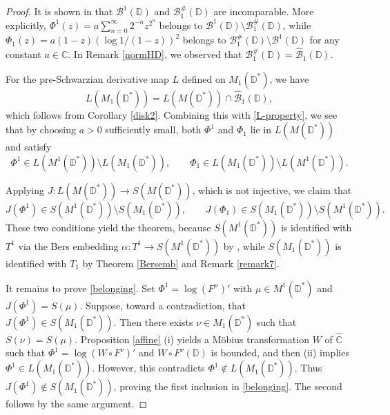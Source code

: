 \documentclass[amstex,12pt,reqno]{amsart}
\theoremstyle{definition}
\begin{document}
\begin{proof}
It is shown in \cite[p.17]{HW} that
$\mathcal B^1(\mathbb D)$ and $\mathcal B_1^\#(\mathbb D)$ are incomparable. 
More explicitly, $\Phi^1(z)=a\sum_{n=0}^\infty 2^{-n}z^{2^n}$ belongs to 
$\mathcal B^1(\mathbb D) \setminus \mathcal B_1^\#(\mathbb D)$, while
$\Phi_1(z)=a(1-z)(\log 1/(1-z))^2$ belongs to $\mathcal B_1^\#(\mathbb D) \setminus \mathcal B^1(\mathbb D)$ for
any constant $a \in \mathbb C$.
In Remark \ref{normHD}, we observed that
$\mathcal B_1^\#(\mathbb D)=\widehat{\mathcal B}_1(\mathbb D)$. 

For the pre-Schwarzian derivative map $L$
defined on $M_1(\mathbb D^*)$, we have
\begin{equation}
L(M_1(\mathbb D^*))=L(M(\mathbb D^*)) \cap \widehat{\mathcal B}_1(\mathbb D),
\end{equation}
which follows from Corollary \ref{disk2}.
Combining this with \eqref{L-property}, we see that by choosing $a>0$ sufficiently small, both $\Phi^1$ and $\Phi_1$ lie in $L(M(\mathbb D^*))$ and satisfy
$$
\Phi^1 \in L(M^1(\mathbb D^*)) \setminus L(M_1(\mathbb D^*)), \qquad 
\Phi_1 \in L(M_1(\mathbb D^*)) \setminus L(M^1(\mathbb D^*)).
$$

Applying $J:L(M(\mathbb D^*)) \to S(M(\mathbb D^*))$, which is not injective, we claim that
\begin{equation}\label{belonging}
J(\Phi^1) \in S(M^1(\mathbb D^*)) \setminus S(M_1(\mathbb D^*)), \qquad
J(\Phi_1) \in S(M_1(\mathbb D^*)) \setminus S(M^1(\mathbb D^*)).
\end{equation}
These two conditions yield the theorem, because $S(M^1(\mathbb D^*))$ is identified with $T^1$ via the Bers embedding
$\alpha:T^1 \to S(M^1(\mathbb D^*))$ by \cite[Theorem 3]{Ma3}, while $S(M_1(\mathbb D^*))$ is identified with $T_1$ by Theorem \ref{Bersemb} and
Remark \ref{remark7}.

It remains to prove \eqref{belonging}.
Set $\Phi^1=\log (F^\mu)'$ with $\mu \in M^1(\mathbb D^*)$ and
$J(\Phi^1)=S(\mu)$. 
Suppose, toward a contradiction, that $J(\Phi^1) \in S(M_1(\mathbb D^*))$. Then there exists $\nu \in M_1(\mathbb D^*)$ such that
$S(\nu)=S(\mu)$. 
Proposition \ref{affine} (i)
yields a M\"obius transformation $W$ of $\widehat{\mathbb C}$ such that
$\Phi^1=\log (W \circ F^{\nu})'$ and $W \circ F^{\nu}(\mathbb D)$ is bounded, and then (ii) implies
$\Phi^1 \in L(M_1(\mathbb D^*))$. However, this contradicts $\Phi^1 \notin L(M_1(\mathbb D^*))$.
Thus $J(\Phi^1) \notin S(M_1(\mathbb D^*))$, proving the first inclusion in \eqref{belonging}.
The second follows by the same argument.
\end{proof}
\end{document}
